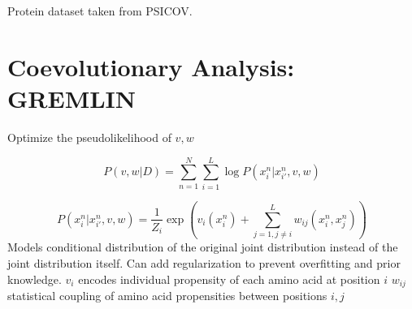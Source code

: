 \documentclass[landscape]{sciposter}
\begin{document}
\begin{multicols}{3}
Protein dataset taken from PSICOV\cite{jones2012psicov}.

\vfill
\columnbreak

\section*{Coevolutionary Analysis: GREMLIN\cite{kamisetty2013assessing}}


Optimize the pseudolikelihood of $v,w$

$$ P(v,w | D) = \sum_{n=1}^N \sum_{i=1}^L \log P (x_i^n | x_{i'}^n, v, w)$$

$$ P (x_i^n | x_{i'}^n, v, w) = \frac{1}{Z_i} \exp \left ( v_i(x_i^n) + \sum_{j=1,j \neq i}^L w_{ij}(x_i^n,x_j^n) \right )$$
Models conditional distribution of the original joint distribution instead of the joint distribution itself. 
Can add regularization to prevent overfitting and prior knowledge. 
$v_i$ encodes individual propensity of each amino acid at position $i$ $w_{ij}$ statistical coupling of amino acid propensities between positions $i,j$

\end{multicols}
\end{document}
